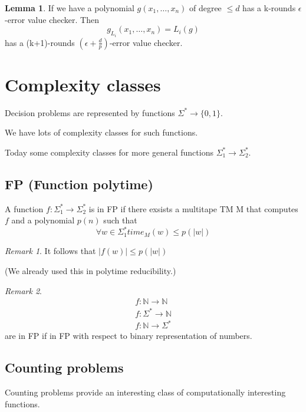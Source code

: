 \documentclass[a4paper,12pt]{article}
\theoremstyle{definition}
\newtheorem{lemma}[counter]{Lemma}
\theoremstyle{remark}
\newtheorem*{remark}{Remark}
\newcommand{\N}{\mathbb{N}}
\begin{document}
\begin{lemma}
    If we have a polynomial $g(x_1, \dots, x_n)$ of degree $\leq d$ has a k-rounds $\epsilon$-error value checker.
    Then 
    \begin{equation*}
        g_{L_i} (x_1, \dots, x_n) = L_i(g)
    \end{equation*}
    has a (k+1)-rounds $(\epsilon + \frac{d}{p})$-error value checker.
\end{lemma}

\section{Complexity classes}
Decision problems are represented by functions $\Sigma^* \to \{0, 1\}$.

We have lots of complexity classes for such functions.

Today some complexity classes for more general functions $\Sigma_1^* \to \Sigma_2^*$.

\subsection{FP (Function polytime)}
A function $f: \Sigma_1^* \to \Sigma_2^*$ is in FP if there exsists a multitape TM M that 
computes $f$ and a polynomial $p(n)$ such that
\begin{equation*}
    \forall w \in \Sigma_1^* time_M(w) \leq p(|w|)
\end{equation*}

\begin{remark}
    It follows that $|f(w)| \leq p(|w|)$
\end{remark}

(We already used this in polytime reducibility.)

\begin{remark}
    \begin{gather*}
        f: \N \to \N \\
        f: \Sigma^* \to \N \\
        f: \N \to \Sigma^*
    \end{gather*}
    are in FP if in FP with respect to binary representation of numbers.
\end{remark}

\subsection{Counting problems}
Counting problems provide an interesting class of computationally interesting functions.
\end{document}
